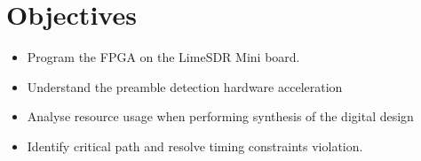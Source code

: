 \section*{Objectives}

\begin{itemize}
    \item Program the FPGA on the LimeSDR Mini board.
    \item Understand the preamble detection hardware acceleration
     \item Analyse resource usage when performing synthesis of the digital design
     \item Identify critical path and resolve timing constraints violation. 
\end{itemize}
